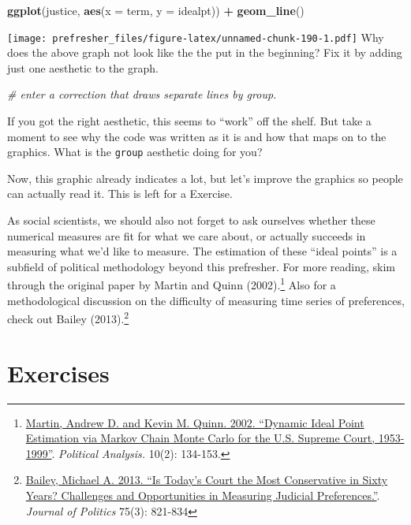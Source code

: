 \documentclass[]{book}
\newenvironment{Shaded}{\begin{snugshade}}{\end{snugshade}}
\newcommand{\KeywordTok}[1]{\textcolor[rgb]{0.13,0.29,0.53}{\textbf{#1}}}
\newcommand{\DataTypeTok}[1]{\textcolor[rgb]{0.13,0.29,0.53}{#1}}
\newcommand{\StringTok}[1]{\textcolor[rgb]{0.31,0.60,0.02}{#1}}
\newcommand{\CommentTok}[1]{\textcolor[rgb]{0.56,0.35,0.01}{\textit{#1}}}
\newcommand{\OperatorTok}[1]{\textcolor[rgb]{0.81,0.36,0.00}{\textbf{#1}}}
\newcommand{\NormalTok}[1]{#1}
\let\rmarkdownfootnote\footnote%
\def\footnote{\protect\rmarkdownfootnote}
\theoremstyle{definition}
\theoremstyle{definition}
\theoremstyle{definition}
\theoremstyle{remark}
\begin{document}
\begin{Shaded}
\begin{Highlighting}[]
\KeywordTok{ggplot}\NormalTok{(justice, }\KeywordTok{aes}\NormalTok{(}\DataTypeTok{x =}\NormalTok{ term, }\DataTypeTok{y =}\NormalTok{ idealpt)) }\OperatorTok{+}
\StringTok{  }\KeywordTok{geom_line}\NormalTok{()}
\end{Highlighting}
\end{Shaded}

\texttt{[image: prefresher\_files/figure-latex/unnamed-chunk-190-1.pdf]}
Why does the above graph not look like the the put in the beginning? Fix
it by adding just one aesthetic to the graph.

\begin{Shaded}
\begin{Highlighting}[]
\CommentTok{# enter a correction that draws separate lines by group.}
\end{Highlighting}
\end{Shaded}

If you got the right aesthetic, this seems to ``work'' off the shelf.
But take a moment to see why the code was written as it is and how that
maps on to the graphics. What is the \texttt{group} aesthetic doing for
you?

Now, this graphic already indicates a lot, but let's improve the
graphics so people can actually read it. This is left for a Exercise.

As social scientists, we should also not forget to ask ourselves whether
these numerical measures are fit for what we care about, or actually
succeeds in measuring what we'd like to measure. The estimation of these
``ideal points'' is a subfield of political methodology beyond this
prefresher. For more reading, skim through the original paper by Martin
and Quinn (2002).\footnote{\href{http://mqscores.lsa.umich.edu/media/pa02.pdf}{Martin,
  Andrew D. and Kevin M. Quinn. 2002. ``Dynamic Ideal Point Estimation
  via Markov Chain Monte Carlo for the U.S. Supreme Court, 1953-1999''}.
  \emph{Political Analysis.} 10(2): 134-153.} Also for a methodological
discussion on the difficulty of measuring time series of preferences,
check out Bailey (2013).\footnote{\href{https://michaelbailey.georgetown.domains/wp-content/uploads/2018/05/JOP_proofs_June2013.pdf}{Bailey,
  Michael A. 2013. ``Is Today's Court the Most Conservative in Sixty
  Years? Challenges and Opportunities in Measuring Judicial
  Preferences.''}. \emph{Journal of Politics} 75(3): 821-834}

\section*{Exercises}\label{exercises-2}
\end{document}
